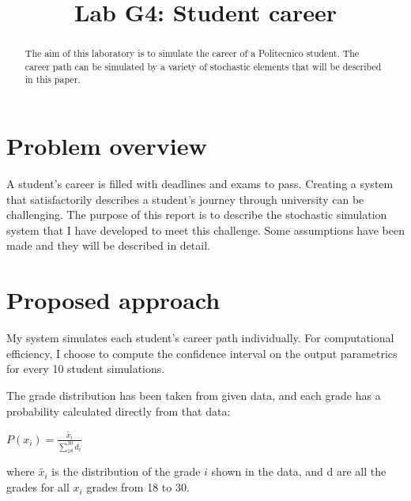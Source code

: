 \documentclass[conference]{IEEEtran}
\begin{document}
\title{
Lab G4: Student career
}

\author{
}

\maketitle
\begin{abstract}
The aim of this laboratory is to simulate the career of a Politecnico student. 
%
The career path can be simulated by a variety of stochastic elements that will be described in this paper.
\end{abstract}

\section{Problem overview}

A student's career is filled with deadlines and exams to pass. 
%
Creating a system that satisfactorily describes a student's journey through university can be challenging.
%
The purpose of this report is to describe the stochastic simulation system that I have developed to meet this challenge.
%
Some assumptions have been made and they will be described in detail.

\section{Proposed approach}

    My system simulates each student's career path individually. 
    For computational efficiency, I choose to compute the confidence interval on the output parametrics for every 10 student simulations.

    The grade distribution has been taken from given data, and each grade has a probability calculated directly from that data:

    \begin{center}
        \begin{math}
            P(x_i) = \frac{\tilde{x_i}}{\sum_{18}^{30} d_i}
        \end{math}
    \end{center}

    where $\tilde{x_i}$ is the distribution of the grade $i$ shown in the data, and d are all the grades for all $x_i$ grades from 18 to 30.
\end{document}
